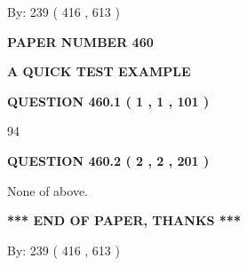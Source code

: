 \documentclass[12pt]{article}
\begin{document}
   
\hspace{1.0in} By: 
 239 ( 416 ,  613 )
   
   
   
   
\newpage 
\setcounter{page}{ 
   460001 } 
   
   
   
   
 {\textbf{ \Large{ PAPER NUMBER  460  }}}
   
   
\vspace{0.2in}
   
   
   
   
   
   
 \vspace{0.2in}
{\LARGE {\textbf{ A QUICK TEST EXAMPLE}}}
   
   
  
\vspace{0.2in}
  
{\textbf{\Large{QUESTION
460.1 
 ( 1 , 1 , 101 )
}}}
  
  
 
 
\noindent{}

94
 
 
  
\vspace{0.2in}
  
{\textbf{\Large{QUESTION
460.2 
 ( 2 , 2 , 201 )
}}}
  
  
 
 
\noindent{}
 
 
 None of above.
 
 
 
 
   
   
 \vspace{0.2in}
 
   
   
   
   
\vspace{1.0in} 
{\textbf{\large{ *** END OF PAPER, THANKS *** }}} 
   
   
\hspace{1.0in} By: 
 239 ( 416 ,  613 )
   
   
   
   
\newpage 
\setcounter{page}{ 
   461001 } 
   
   
   
\end{document}
